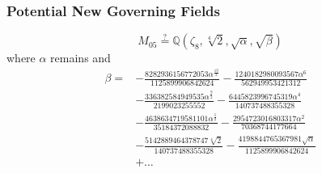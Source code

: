 \documentclass[12pt]{beamer}
\begin{document}
	\begin{frame}
	\frametitle{Potential New Governing Fields}
		$$M_{05} \stackrel{?}{=}\mathbb{Q}\left(\zeta_8, \sqrt[4]{2}, \sqrt{\alpha}, \sqrt{\beta}\right)$$
		where $\alpha$ remains
		and
		\begin{align*}
		\beta = 
		&- \frac{8282936156772053 \alpha^{\frac{13}{2}}}{1125899906842624} 
		- \frac{1240182980093567 \alpha^{6}}{562949953421312} \\
		&- \frac{336382584949535 \alpha^{\frac{9}{2}}}{2199023255552} 
		- \frac{6445823996745319 \alpha^{4}}{140737488355328} \\
		&- \frac{4638634719581101 \alpha^{\frac{5}{2}}}{35184372088832} 
		- \frac{2954723016803317 \alpha^{2}}{70368744177664} 
		\\
		&- \frac{5142889464378747 \sqrt[4]{2}}{140737488355328} 
		- \frac{4198844765367981 \sqrt{\alpha}}{1125899906842624} \\
		&+\dots \\
		\end{align*}
	\end{frame}
\end{document}
